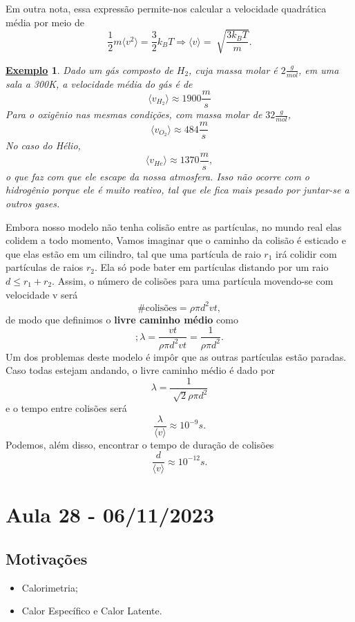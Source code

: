 \documentclass{article}
\newtheorem{example}{\underline{Exemplo}}
\begin{document}
Em outra nota, essa expressão permite-nos calcular a velocidade quadrática média por meio de 
\[
  \frac{1}{2}m \langle v^{2} \rangle = \frac{3}{2}k_{B}T \Rightarrow \langle v \rangle = \sqrt[]{\frac{3k_{B}T}{m}}.
\]
\begin{example}
  Dado um gás composto de \(H_{2}\), cuja massa molar é \(2\frac{g}{mol}\), em uma sala a 300K, a velocidade média do gás é de 
  \[
    \langle v_{H_{2}} \rangle\approx 1900\frac{m}{s}
  \]
  Para o oxigênio nas mesmas condições, com massa molar de \(32 \frac{g}{mol}\),
  \[
    \langle v_{O_{2}} \rangle\approx 484 \frac{m}{s}
  \]
  No caso do Hélio, 
  \[
    \langle v_{He} \rangle\approx 1370 \frac{m}{s},
  \]
  o que faz com que ele escape da nossa atmosfera. Isso não ocorre com o hidrogênio porque ele é muito reativo,
  tal que ele fica mais pesado por juntar-se a outros gases.
\end{example}
Embora nosso modelo não tenha colisão entre as partículas, no mundo real elas colidem a todo momento, Vamos imaginar
que o caminho da colisão é esticado e que elas estão em um cilindro, tal que uma partícula de raio \(r_{1}\) irá colidir com partículas de raios \(r_{2}\).
Ela só pode bater em partículas distando por um raio \(d\leq r_{1} + r_{2}\). Assim, o número de colisões para uma
partícula movendo-se com velocidade v será 
\[
  \#\text{colisões} = \rho \pi d^{2}vt,
\]
de modo que definimos o \textbf{livre caminho médio} como 
\[
  ;\lambda = \frac{vt}{\rho \pi d^{2}vt} = \frac{1}{\rho \pi d^{2}}.
\]
Um dos problemas deste modelo é impôr que as outras partículas estão paradas. Caso todas estejam andando, o livre
caminho médio é dado por 
\[
  \lambda = \frac{1}{\sqrt[]{2}\rho \pi d^{2}}
\]
e o tempo entre colisões será 
\[
  \frac{\lambda }{\langle v \rangle}\approx 10^{-9}s.
\]
Podemos, além disso, encontrar o tempo de duração de colisões 
\[
  \frac{d}{\langle v \rangle}\approx 10^{-12}s.
\]
\newpage

\section{Aula 28 - 06/11/2023}
\subsection{Motivações}
\begin{itemize}
  \item Calorimetria;
  \item Calor Específico e Calor Latente.
\end{itemize}
\end{document}
